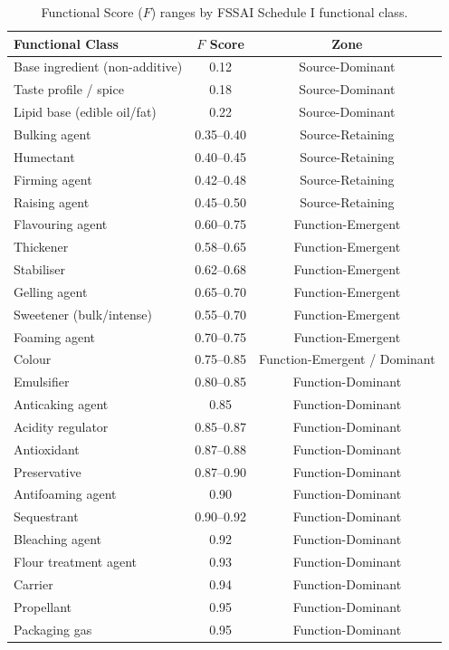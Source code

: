 \documentclass[12pt,a3paper]{article}
\begin{document}
\begin{table}[htbp]
\centering
\caption{Functional Score ($F$) ranges by FSSAI Schedule I functional class.}
\label{tab:fscores}
\renewcommand{\arraystretch}{1.2}
\begin{tabular}{lcc}
\toprule
\textbf{Functional Class} & \textbf{$F$ Score} & \textbf{Zone} \\
\midrule
Base ingredient (non-additive) & 0.12 & Source-Dominant \\
Taste profile / spice & 0.18 & Source-Dominant \\
Lipid base (edible oil/fat) & 0.22 & Source-Dominant \\
Bulking agent & 0.35--0.40 & Source-Retaining \\
Humectant & 0.40--0.45 & Source-Retaining \\
Firming agent & 0.42--0.48 & Source-Retaining \\
Raising agent & 0.45--0.50 & Source-Retaining \\
Flavouring agent & 0.60--0.75 & Function-Emergent \\
Thickener & 0.58--0.65 & Function-Emergent \\
Stabiliser & 0.62--0.68 & Function-Emergent \\
Gelling agent & 0.65--0.70 & Function-Emergent \\
Sweetener (bulk/intense) & 0.55--0.70 & Function-Emergent \\
Foaming agent & 0.70--0.75 & Function-Emergent \\
Colour & 0.75--0.85 & Function-Emergent / Dominant \\
Emulsifier & 0.80--0.85 & Function-Dominant \\
Anticaking agent & 0.85 & Function-Dominant \\
Acidity regulator & 0.85--0.87 & Function-Dominant \\
Antioxidant & 0.87--0.88 & Function-Dominant \\
Preservative & 0.87--0.90 & Function-Dominant \\
Antifoaming agent & 0.90 & Function-Dominant \\
Sequestrant & 0.90--0.92 & Function-Dominant \\
Bleaching agent & 0.92 & Function-Dominant \\
Flour treatment agent & 0.93 & Function-Dominant \\
Carrier & 0.94 & Function-Dominant \\
Propellant & 0.95 & Function-Dominant \\
Packaging gas & 0.95 & Function-Dominant \\
\bottomrule
\end{tabular}
\end{table}
\end{document}
